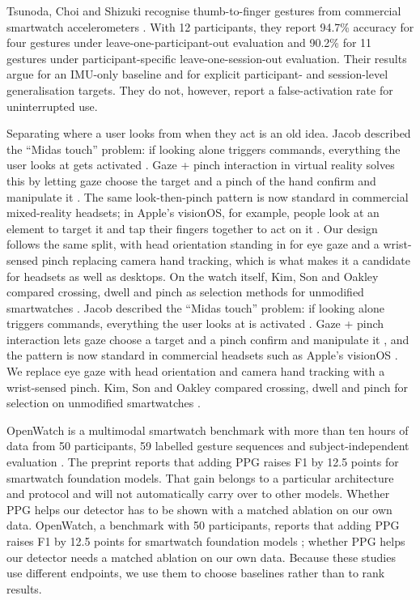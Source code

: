 \iffull
Tsunoda, Choi and Shizuki recognise thumb-to-finger gestures from commercial smartwatch accelerometers \cite{tsunoda}. With 12 participants, they report 94.7\% accuracy for four gestures under leave-one-participant-out evaluation and 90.2\% for 11 gestures under participant-specific leave-one-session-out evaluation. Their results argue for an IMU-only baseline and for explicit participant- and session-level generalisation targets. They do not, however, report a false-activation rate for uninterrupted use.
\fi

\label{look-then-act-interaction}

\iffull
Separating where a user looks from when they act is an old idea. Jacob described the ``Midas touch'' problem: if looking alone triggers commands, everything the user looks at gets activated \cite{jacob1990wysiwyg,jacob1991eyemovements}. Gaze + pinch interaction in virtual reality solves this by letting gaze choose the target and a pinch of the hand confirm and manipulate it \cite{pfeuffer2017gazepinch}. The same look-then-pinch pattern is now standard in commercial mixed-reality headsets; in Apple's visionOS, for example, people look at an element to target it and tap their fingers together to act on it \cite{applevisionos}. Our design follows the same split, with head orientation standing in for eye gaze and a wrist-sensed pinch replacing camera hand tracking, which is what makes it a candidate for headsets as well as desktops. On the watch itself, Kim, Son and Oakley compared crossing, dwell and pinch as selection methods for unmodified smartwatches \cite{kim2025pinch}.
\else
Jacob described the ``Midas touch'' problem: if looking alone triggers commands, everything the user looks at is activated \cite{jacob1990wysiwyg,jacob1991eyemovements}. Gaze + pinch interaction lets gaze choose a target and a pinch confirm and manipulate it \cite{pfeuffer2017gazepinch}, and the pattern is now standard in commercial headsets such as Apple's visionOS \cite{applevisionos}. We replace eye gaze with head orientation and camera hand tracking with a wrist-sensed pinch. Kim, Son and Oakley compared crossing, dwell and pinch for selection on unmodified smartwatches \cite{kim2025pinch}.
\fi

\label{multimodal-learning-and-the-remaining-gap}

\iffull
OpenWatch is a multimodal smartwatch benchmark with more than ten hours of data from 50 participants, 59 labelled gesture sequences and subject-independent evaluation \cite{openwatch}. The preprint reports that adding PPG raises F1 by 12.5 points for smartwatch foundation models. That gain belongs to a particular architecture and protocol and will not automatically carry over to other models. Whether PPG helps our detector has to be shown with a matched ablation on our own data.
\else
OpenWatch, a benchmark with 50 participants, reports that adding PPG raises F1 by 12.5 points for smartwatch foundation models \cite{openwatch}; whether PPG helps our detector needs a matched ablation on our own data. Because these studies use different endpoints, we use them to choose baselines rather than to rank results.
\fi

